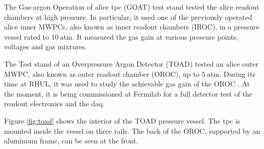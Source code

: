 The Gas-argon Operation of \gls{alice} \gls{tpc} (GOAT) test stand tested the \gls{alice} readout chambers at high pressure. In particular, it used one of the previously operated \gls{alice} inner MWPCs, also known as inner readout chambers (IROC), in a pressure vessel rated to $10~\mathrm{atm}$. It measured the gas gain at various pressure points, voltages and gas mixtures.

The Test stand of an Overpressure Argon Detector (TOAD) tested an \gls{alice} outer MWPC, also known as outer readout chamber (OROC), up to $5~\mathrm{atm}$. During its time at RHUL, it was used to study the achievable gas gain of the OROC \cite{Ritchie-Yates2023}. At the moment, it is being commissioned at Fermilab for a full detector test of the readout electronics and the \gls{daq}.

Figure \ref{fig:toad} shows the interior of the TOAD pressure vessel. The \gls{tpc} is mounted inside the vessel on three rails. The back of the OROC, supported by an aluminium frame, can be seen at the front.

